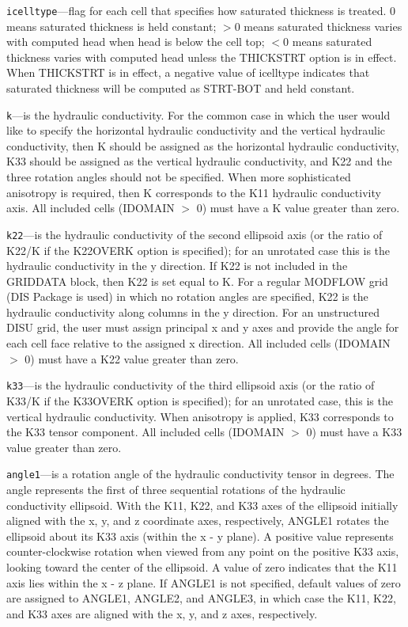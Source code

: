 \begin{description}
\item \texttt{icelltype}---flag for each cell that specifies how saturated thickness is treated.  0 means saturated thickness is held constant;  $>$0 means saturated thickness varies with computed head when head is below the cell top; $<$0 means saturated thickness varies with computed head unless the THICKSTRT option is in effect.  When THICKSTRT is in effect, a negative value of icelltype indicates that saturated thickness will be computed as STRT-BOT and held constant.

\item \texttt{k}---is the hydraulic conductivity.  For the common case in which the user would like to specify the horizontal hydraulic conductivity and the vertical hydraulic conductivity, then K should be assigned as the horizontal hydraulic conductivity, K33 should be assigned as the vertical hydraulic conductivity, and K22 and the three rotation angles should not be specified.  When more sophisticated anisotropy is required, then K corresponds to the K11 hydraulic conductivity axis.  All included cells (IDOMAIN $>$ 0) must have a K value greater than zero.

\item \texttt{k22}---is the hydraulic conductivity of the second ellipsoid axis (or the ratio of K22/K if the K22OVERK option is specified); for an unrotated case this is the hydraulic conductivity in the y direction.  If K22 is not included in the GRIDDATA block, then K22 is set equal to K.  For a regular MODFLOW grid (DIS Package is used) in which no rotation angles are specified, K22 is the hydraulic conductivity along columns in the y direction. For an unstructured DISU grid, the user must assign principal x and y axes and provide the angle for each cell face relative to the assigned x direction.  All included cells (IDOMAIN $>$ 0) must have a K22 value greater than zero.

\item \texttt{k33}---is the hydraulic conductivity of the third ellipsoid axis (or the ratio of K33/K if the K33OVERK option is specified); for an unrotated case, this is the vertical hydraulic conductivity.  When anisotropy is applied, K33 corresponds to the K33 tensor component.  All included cells (IDOMAIN $>$ 0) must have a K33 value greater than zero.

\item \texttt{angle1}---is a rotation angle of the hydraulic conductivity tensor in degrees. The angle represents the first of three sequential rotations of the hydraulic conductivity ellipsoid. With the K11, K22, and K33 axes of the ellipsoid initially aligned with the x, y, and z coordinate axes, respectively, ANGLE1 rotates the ellipsoid about its K33 axis (within the x - y plane). A positive value represents counter-clockwise rotation when viewed from any point on the positive K33 axis, looking toward the center of the ellipsoid. A value of zero indicates that the K11 axis lies within the x - z plane. If ANGLE1 is not specified, default values of zero are assigned to ANGLE1, ANGLE2, and ANGLE3, in which case the K11, K22, and K33 axes are aligned with the x, y, and z axes, respectively.


\end{description}

